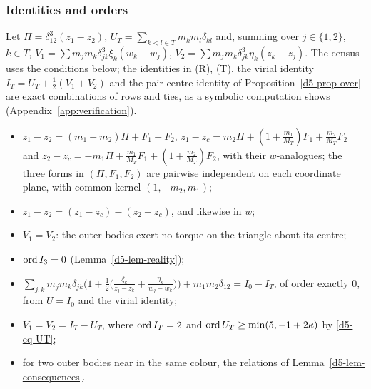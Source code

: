 \subsubsection{Identities and orders}\label{d5-census}
Let $\Pi=\delta_{12}^3(z_1-z_2)$, $U_T=\sum_{k<l\in T}m_km_l\delta_{kl}$ and, summing over
$j\in\{1,2\}$, $k\in T$, $V_1=\sum m_jm_k\delta_{jk}^3\xi_k(w_k-w_j)$,
$V_2=\sum m_jm_k\delta_{jk}^3\eta_k(z_k-z_j)$.  The census uses the conditions below; the identities
in (R), (T), the virial identity $I_T=U_T+\frac12(V_1+V_2)$ and the pair-centre identity of
Proposition~\ref{d5-prop-over} are exact combinations of rows and ties, as a symbolic computation
shows (Appendix~\ref{app:verification}).
\begin{itemize}
\item[(R)] $z_1-z_2=(m_1+m_2)\Pi+F_1-F_2$, $z_1-z_c=m_2\Pi+(1+\frac{m_1}{M_T})F_1+\frac{m_2}{M_T}F_2$
and $z_2-z_c=-m_1\Pi+\frac{m_1}{M_T}F_1+(1+\frac{m_2}{M_T})F_2$, with their $w$-analogues; the three
forms in $(\Pi,F_1,F_2)$ are pairwise independent on each coordinate plane, with common kernel
$(1,-m_2,m_1)$;
\item[(C)] $z_1-z_2=(z_1-z_c)-(z_2-z_c)$, and likewise in $w$;
\item[(T)] $V_1=V_2$: the outer bodies exert no torque on the triangle about its centre;
\item[(A)] $\operatorname{ord} I_3=0$ (Lemma~\ref{d5-lem-reality});
\item[(B)] $\sum_{j,k}m_jm_k\delta_{jk}\bigl(1+\frac12\bigl(\frac{\xi_k}{z_j-z_k}+\frac{\eta_k}{w_j-w_k}\bigr)\bigr)
+m_1m_2\delta_{12}=I_0-I_T$, of order exactly $0$, from $U=I_0$ and the virial identity;
\item[(V)] $V_1=V_2=I_T-U_T$, where $\operatorname{ord} I_T=2$ and $\operatorname{ord} U_T\ge\min(5,-1+2\kappa)$ by
\eqref{d5-eq-UT};
\item[(M)] for two outer bodies near in the same colour, the relations of
Lemma~\ref{d5-lem-consequences}.
\end{itemize}

